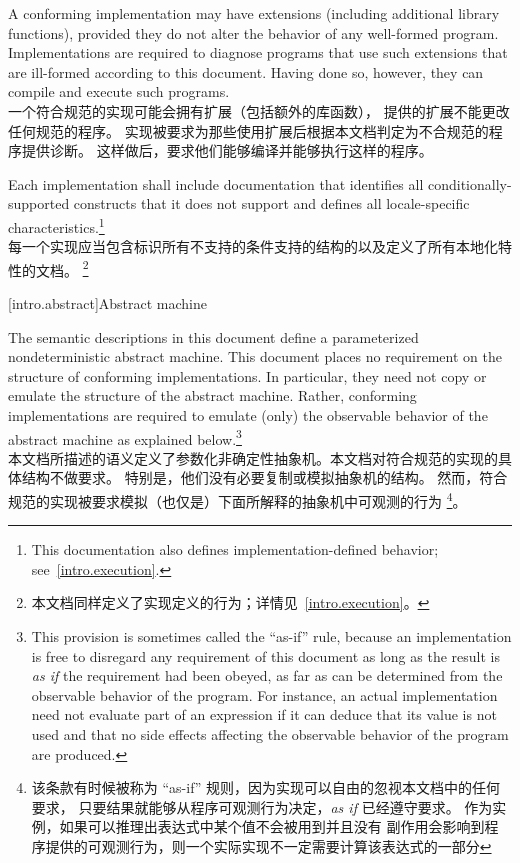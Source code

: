 \pnum
A conforming implementation may have extensions (including
additional library functions), provided they do not alter the
behavior of any well-formed program.
Implementations are required to diagnose programs that use such
extensions that are ill-formed according to this document.
Having done so, however, they can compile and execute such programs. \\
一个符合规范的实现可能会拥有扩展（包括额外的库函数），
提供的扩展不能更改任何规范的程序。
实现被要求为那些使用扩展后根据本文档判定为不合规范的程序提供诊断。
这样做后，要求他们能够编译并能够执行这样的程序。

\pnum
Each implementation shall include documentation that identifies all
conditionally-supported constructs
that it does not support and defines all locale-specific characteristics.\footnote{This documentation also defines implementation-defined behavior;
see~\ref{intro.execution}.} \\
每一个实现应当包含标识所有不支持的条件支持的结构的以及定义了所有本地化特性的文档。
\footnote{本文档同样定义了实现定义的行为；详情见~\ref{intro.execution}。}
%
%

[intro.abstract]{Abstract machine}

\pnum
{}%
%
The semantic descriptions in this document define a
parameterized nondeterministic abstract machine. This document
places no requirement on the structure of conforming
implementations. In particular, they need not copy or emulate the
structure of the abstract machine. 
%
%
Rather, conforming implementations are required to emulate (only) the observable
behavior of the abstract machine as explained below.\footnote{This provision is
sometimes called the ``as-if'' rule, because an implementation is free to
disregard any requirement of this document as long as the result
is \emph{as if} the requirement had been obeyed, as far as can be determined
from the observable behavior of the program. For instance, an actual
implementation need not evaluate part of an expression if it can deduce that its
value is not used and that no
%
side effects affecting the
observable behavior of the program are produced.}\\
本文档所描述的语义定义了参数化非确定性抽象机。本文档对符合规范的实现的具体结构不做要求。
特别是，他们没有必要复制或模拟抽象机的结构。
然而，符合规范的实现被要求模拟（也仅是）下面所解释的抽象机中可观测的行为
\footnote{该条款有时候被称为 ``as-if'' 规则，因为实现可以自由的忽视本文档中的任何要求，
只要结果就能够从程序可观测行为决定，\emph{as if} 已经遵守要求。
作为实例，如果可以推理出表达式中某个值不会被用到并且没有 %
副作用会影响到程序提供的可观测行为，则一个实际实现不一定需要计算该表达式的一部分}。

